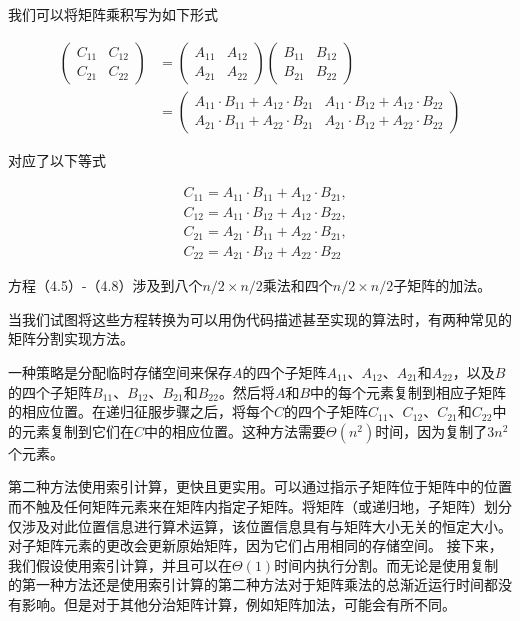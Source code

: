 \documentclass[lang=cn,newtx,10pt,scheme=chinese]{elegantbook}
\begin{document}
我们可以将矩阵乘积写为如下形式

$$
\begin{aligned}
\left(\begin{array}{ll}
C_{11} & C_{12} \\
C_{21} & C_{22}
\end{array}\right) & =\left(\begin{array}{ll}
A_{11} & A_{12} \\
A_{21} & A_{22}
\end{array}\right)\left(\begin{array}{ll}
B_{11} & B_{12} \\
B_{21} & B_{22}
\end{array}\right) \\
& =\left(\begin{array}{ll}
A_{11} \cdot B_{11}+A_{12} \cdot B_{21} & A_{11} \cdot B_{12}+A_{12} \cdot B_{22} \\
A_{21} \cdot B_{11}+A_{22} \cdot B_{21} & A_{21} \cdot B_{12}+A_{22} \cdot B_{22}
\end{array}\right)
\end{aligned}
$$

对应了以下等式

$$
\begin{aligned}
& C_{11}=A_{11} \cdot B_{11}+A_{12} \cdot B_{21}, \\
& C_{12}=A_{11} \cdot B_{12}+A_{12} \cdot B_{22}, \\
& C_{21}=A_{21} \cdot B_{11}+A_{22} \cdot B_{21}, \\
& C_{22}=A_{21} \cdot B_{12}+A_{22} \cdot B_{22}
\end{aligned}
$$

方程（4.5）-（4.8）涉及到八个$n / 2 \times n / 2$乘法和四个$n / 2 \times n / 2$子矩阵的加法。

当我们试图将这些方程转换为可以用伪代码描述甚至实现的算法时，有两种常见的矩阵分割实现方法。

一种策略是分配临时存储空间来保存$A$的四个子矩阵$A_{11}$、$A_{12}$、$A_{21}$和$A_{22}$，以及$B$的四个子矩阵$B_{11}$、$B_{12}$、$B_{21}$和$B_{22}$。然后将$A$和$B$中的每个元素复制到相应子矩阵的相应位置。在递归征服步骤之后，将每个$C$的四个子矩阵$C_{11}$、$C_{12}$、$C_{21}$和$C_{22}$中的元素复制到它们在$C$中的相应位置。这种方法需要$\Theta\left(n^2\right)$时间，因为复制了$3n^2$个元素。

第二种方法使用索引计算，更快且更实用。可以通过指示子矩阵位于矩阵中的位置而不触及任何矩阵元素来在矩阵内指定子矩阵。将矩阵（或递归地，子矩阵）划分仅涉及对此位置信息进行算术运算，该位置信息具有与矩阵大小无关的恒定大小。对子矩阵元素的更改会更新原始矩阵，因为它们占用相同的存储空间。
接下来，我们假设使用索引计算，并且可以在$\Theta(1)$时间内执行分割。而无论是使用复制的第一种方法还是使用索引计算的第二种方法对于矩阵乘法的总渐近运行时间都没有影响。但是对于其他分治矩阵计算，例如矩阵加法，可能会有所不同。
\end{document}
